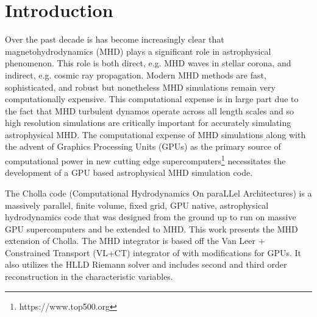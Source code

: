 \section{Introduction}
\label{sec:intro}


Over the past decade is has become increasingly clear that magnetohydrodynamics (MHD) plays a significant role in astrophysical phenomenon. This role is both direct, e.g. MHD waves in stellar corona, and indirect, e.g. cosmic ray propagation. Modern MHD methods are fast, sophisticated, and robust but nonetheless MHD simulations remain very computationally expensive. This computational expense is in large part due to the fact that MHD turbulent dynamos operate across all length scales and so high resolution simulations are critically important for accurately simulating astrophysical MHD. The computational expense of MHD simulations along with the advent of Graphics Processing Units (GPUs) as the primary source of computational power in new cutting edge supercomputers\footnote{https://www.top500.org} necessitates the development of a GPU based astrophysical MHD simulation code. 

The Cholla code (Computational Hydrodynamics On paraLLel Architectures)\citep{schneider_2015} is a massively parallel, finite volume, fixed grid, GPU native, astrophysical hydrodynamics code that was designed from the ground up to run on massive GPU supercomputers and be extended to MHD. This work presents the MHD extension of Cholla. The MHD integrator is based off the Van Leer + Constrained Transport (VL+CT) integrator of \cite{stone_2009} with modifications for GPUs. It also utilizes the HLLD Riemann solver and includes second and third order reconstruction in the characteristic variables.

